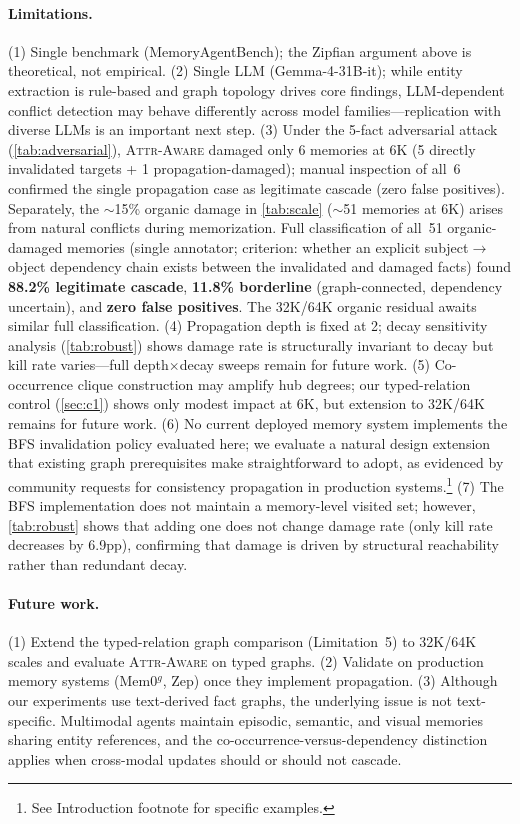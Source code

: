 \documentclass{article}
\newcommand{\attraware}{\textsc{Attr-Aware}}
\begin{document}
\paragraph{Limitations.}
(1) Single benchmark (MemoryAgentBench); the Zipfian argument above is theoretical, not empirical.
(2) Single LLM (Gemma-4-31B-it); while entity extraction is rule-based and graph topology drives core findings, LLM-dependent conflict detection may behave differently across model families---replication with diverse LLMs is an important next step.
(3) Under the 5-fact adversarial attack (\cref{tab:adversarial}), \attraware{} damaged only 6 memories at 6K (5 directly invalidated targets + 1 propagation-damaged); manual inspection of all~6 confirmed the single propagation case as legitimate cascade (zero false positives).
Separately, the ${\sim}$15\% organic damage in \cref{tab:scale} (${\sim}$51 memories at 6K) arises from natural conflicts during memorization.
Full classification of all~51 organic-damaged memories (single annotator; criterion: whether an explicit subject$\rightarrow$object dependency chain exists between the invalidated and damaged facts) found \textbf{88.2\% legitimate cascade}, \textbf{11.8\% borderline} (graph-connected, dependency uncertain), and \textbf{zero false positives}.
The 32K/64K organic residual awaits similar full classification.
(4) Propagation depth is fixed at 2; decay sensitivity analysis (\cref{tab:robust}) shows damage rate is structurally invariant to decay but kill rate varies---full depth$\times$decay sweeps remain for future work.
(5) Co-occurrence clique construction may amplify hub degrees; our typed-relation control (\cref{sec:c1}) shows only modest impact at 6K, but extension to 32K/64K remains for future work.
(6) No current deployed memory system implements the BFS invalidation policy evaluated here; we evaluate a natural design extension that existing graph prerequisites make straightforward to adopt, as evidenced by community requests for consistency propagation in production systems.\footnote{See Introduction footnote for specific examples.}
(7) The BFS implementation does not maintain a memory-level visited set; however, \cref{tab:robust} shows that adding one does not change damage rate (only kill rate decreases by 6.9pp), confirming that damage is driven by structural reachability rather than redundant decay.

\paragraph{Future work.}
(1) Extend the typed-relation graph comparison (Limitation~5) to 32K/64K scales and evaluate \attraware{} on typed graphs.
(2) Validate on production memory systems (Mem0$^g$, Zep) once they implement propagation.
(3) Although our experiments use text-derived fact graphs, the underlying issue is not text-specific.
Multimodal agents maintain episodic, semantic, and visual memories sharing entity references, and the co-occurrence-versus-dependency distinction applies when cross-modal updates should or should not cascade.
\end{document}
